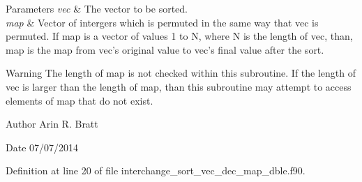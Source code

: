 \begin{DoxyParams}{Parameters}
{\em vec} & The vector to be sorted.\\
\hline
{\em map} & Vector of intergers which is permuted in the same way that vec is permuted. If map is a vector of values 1 to N, where N is the length of vec, than, map is the map from vec's original value to vec's final value after the sort.\\
\hline
\end{DoxyParams}
\begin{DoxyWarning}{Warning}
The length of map is not checked within this subroutine. If the length of vec is larger than the length of map, than this subroutine may attempt to access elements of map that do not exist.
\end{DoxyWarning}
\begin{DoxyAuthor}{Author}
Arin R. Bratt 
\end{DoxyAuthor}
\begin{DoxyDate}{Date}
07/07/2014 
\end{DoxyDate}


Definition at line 20 of file interchange\-\_\-sort\-\_\-vec\-\_\-dec\-\_\-map\-\_\-dble.\-f90.

